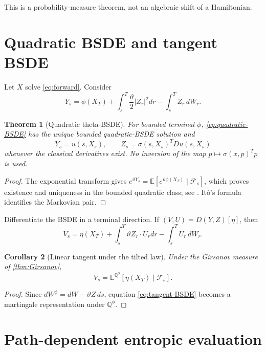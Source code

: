 \documentclass[11pt,reqno]{amsart}
\newtheorem{theorem}{Theorem}[section]
\newtheorem{corollary}[theorem]{Corollary}
\theoremstyle{definition}
\theoremstyle{remark}
\newcommand{\E}{\mathbb E}
\newcommand{\F}{\mathcal F}
\newcommand{\Qp}{\mathbb Q}
\newcommand{\abs}[1]{\left\lvert #1\right\rvert}
\begin{document}
This is a probability-measure theorem, not an algebraic shift of a Hamiltonian.

\section{Quadratic BSDE and tangent BSDE}\label{sec:BSDE}

Let $X$ solve \eqref{eq:forward}.  Consider
\begin{equation}\label{eq:quadratic-BSDE}
 Y_s=\phi(X_T)+\int_s^T\frac\vartheta2\abs{Z_r}^2dr
 -\int_s^TZ_r\,dW_r.
\end{equation}

\begin{theorem}[Quadratic theta-BSDE]\label{thm:quadratic-BSDE}
For bounded terminal $\phi$, \eqref{eq:quadratic-BSDE} has the unique bounded
quadratic-BSDE solution and
\[
 Y_s=u(s,X_s),
 \qquad Z_s=\sigma(s,X_s)^TDu(s,X_s)
\]
whenever the classical derivatives exist.  No inversion of the map
$p\mapsto\sigma(x,p)^Tp$ is used.
\end{theorem}

\begin{proof}
The exponential transform gives
$e^{\vartheta Y_s}=\E[e^{\vartheta\phi(X_T)}\mid\F_s]$, which proves existence
and uniqueness in the bounded quadratic class; see \cite{Kobylanski2000}.
It\^o's formula identifies the Markovian pair.
\end{proof}

Differentiate the BSDE in a terminal direction.  If
$(V,U)=D(Y,Z)[\eta]$, then
\begin{equation}\label{eq:tangent-BSDE}
 V_s=\eta(X_T)+\int_s^T\vartheta Z_r\cdot U_rdr
 -\int_s^TU_r\,dW_r.
\end{equation}

\begin{corollary}[Linear tangent under the tilted law]\label{cor:tangent-BSDE}
Under the Girsanov measure of \cref{thm:Girsanov},
\[
 V_s=\E^{\Qp^{\phi}}[\eta(X_T)\mid\F_s].
\]
\end{corollary}

\begin{proof}
Since $dW^{\phi}=dW-\vartheta Z\,ds$, equation
\eqref{eq:tangent-BSDE} becomes a martingale representation under
$\Qp^{\phi}$.
\end{proof}

\section{Path-dependent entropic evaluation}\label{sec:path}
\end{document}
